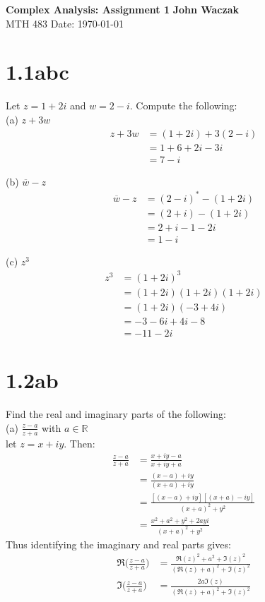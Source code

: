 \documentclass[a4paper, 11pt]{article}
\begin{document}
\noindent
\large\textbf{Complex Analysis: Assignment 1} \hfill \textbf{John Waczak} \\
\normalsize MTH 483 \hfill  Date: \today \\

\section*{1.1abc}
Let $z = 1 + 2i$ and $w = 2 -i$. Compute the following: \\

\noindent(a) $z + 3w$ \\ 
	\begin{align*}
		z+3w &= (1+2i)+3(2-i)\\
			&= 1+6+2i-3i \\ 
			&= 7-i
	\end{align*}

\noindent(b) $\overline{w}-z$
	\begin{align*}
		\overline{w}-z &= (2-i)^*-(1+2i) \\ 
			&= (2+i)-(1+2i) \\
			&= 2+i-1-2i \\ 
			&= 1-i
	\end{align*}
	
\noindent(c) $z^3$
	\begin{align*}
		z^3 &= (1+2i)^3 \\
			&= (1+2i)(1+2i)(1+2i) \\ 
			&= (1+2i)(-3+4i) \\ 
			&= -3-6i+4i-8 \\ 
			&= -11 -2i
	\end{align*}
	
\section*{1.2ab}
Find the real and imaginary parts of the following:\\

\noindent(a) $\frac{z-a}{z+a}$ with $a\in\mathbb{R}$ \\ 

let $z = x + iy$. Then: 	
	\begin{align*}
		\frac{z-a}{z+a} &= \frac{x+iy-a}{x+iy+a} \\ 
			&= \frac{(x-a)+iy}{(x+a)+iy} \\ 
			&= \frac{[(x-a)+iy][(x+a)-iy]}{(x+a)^2+y^2} \\ 
			&= \frac{x^2+a^2+y^2+2ayi}{(x+a)^2+y^2} 
	\end{align*}
 Thus identifying the imaginary and real parts gives:
	 \begin{align*}
	 	\Re\Big(\frac{z-a}{z+a}\Big) &= \frac{\Re(z)^2+a^2+\Im(z)^2}{(\Re(z)+a)^2+\Im(z)^2} \\ 
	 	\Im\Big(\frac{z-a}{z+a}\Big) &= \frac{2a\Im(z)}{(\Re(z)+a)^2+\Im(z)^2}
	 \end{align*}
	
\end{document}
